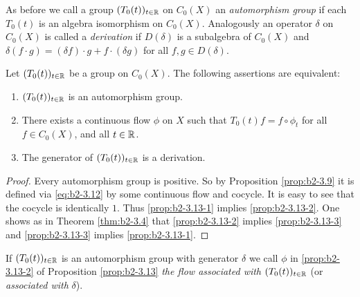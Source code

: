 As before we call a group $(T_{0}(t))_{t \in \mathbb{R}}$ on $C_{0}(X)$ an \emph{automorphism group} if each $T_{0}(t)$ is an algebra isomorphism on $C_{0}(X)$.
Analogously an operator $\delta$ on $C_{0}(X)$ is called a \emph{derivation} if $D(\delta)$ is a subalgebra of $C_{0}(X)$ and $\delta(f \cdot g) = (\delta f) \cdot g + f \cdot (\delta g)$ for all $f,g \in D(\delta)$.

\begin{proposition}\label{prop:b2-3.13}
Let $(T_{0}(t))_{t \in \mathbb{R}}$ be a group on $C_{0}(X)$.
The following assertions are equivalent:
\begin{enumerate}[\upshape (a)]
\item \label{prop:b2-3.13-1}
$(T_{0}(t))_{t \in \mathbb{R}}$ is an automorphism group.
\item \label{prop:b2-3.13-2}
There exists a continuous flow $\phi$ on $X$ such that $T_{0}(t)f = f \circ \phi_{t}$  for all \\
 $f \in C_{0}(X)$, and all $t \in \mathbb{R}$.
\item \label{prop:b2-3.13-3} 
The generator of $(T_{0}(t))_{t \in \mathbb{R}}$ is a derivation.
\end{enumerate}
\end{proposition}

\begin{proof}
Every automorphism group is positive.
So by Proposition \ref{prop:b2-3.9}  it is defined via \eqref{eq:b2-3.12} by some continuous flow and cocycle.
It is easy to see that the cocycle is identically $1$.
Thus \ref{prop:b2-3.13-1} implies \ref{prop:b2-3.13-2}.
One shows as in Theorem \ref{thm:b2-3.4}  that \ref{prop:b2-3.13-2} implies \ref{prop:b2-3.13-3} and \ref{prop:b2-3.13-3} implies \ref{prop:b2-3.13-1}.
\end{proof}

If $(T_{0}(t))_{t \in \mathbb{R}}$ is an automorphism group with generator $\delta$ we call $\phi$ in \ref{prop:b2-3.13-2} of Proposition \ref{prop:b2-3.13} \emph{the flow associated with} $(T_{0}(t))_{t \in \mathbb{R}}$ (or \emph{associated with} $\delta$).

